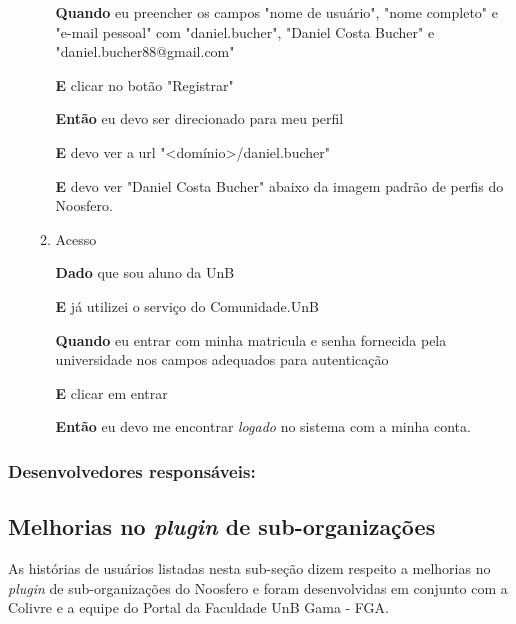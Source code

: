 \begin{enumerate}
\begin{enumerate}
\textbf{Quando} eu preencher os campos "nome de usuário",
"nome completo" e "e-mail pessoal" com "daniel.bucher", "Daniel Costa Bucher" e
"daniel.bucher88@gmail.com"

\textbf{E} clicar no botão "Registrar"

\textbf{Então} eu devo ser direcionado para meu perfil

\textbf{E} devo ver a url "<domínio>/daniel.bucher"

\textbf{E} devo ver "Daniel Costa Bucher" abaixo da imagem padrão de perfis
do Noosfero.


\item Acesso

\textbf{Dado} que sou aluno da UnB

\textbf{E} já utilizei o serviço do Comunidade.UnB

\textbf{Quando} eu entrar com minha matricula e senha fornecida pela universidade
nos campos adequados para autenticação

\textbf{E} clicar em entrar

\textbf{Então} eu devo me encontrar \textit{logado} no sistema com a minha conta.

\end{enumerate}

\end{enumerate}

\subsubsection*{Desenvolvedores responsáveis:}




\subsection{Melhorias no \textit{plugin} de sub-organizações}

As histórias de usuários listadas nesta sub-seção dizem respeito a melhorias
no \textit{plugin} de sub-organizações do Noosfero e foram desenvolvidas em
conjunto com a Colivre e a equipe do Portal da Faculdade UnB Gama - FGA.

